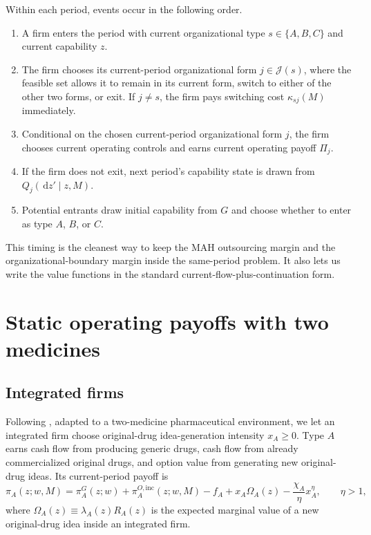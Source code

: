 \documentclass[12pt]{article}
\newcommand{\1}{\mathbf{1}}
\newcommand{\dd}{\,\mathrm{d}}
\begin{document}
Within each period, events occur in the following order.
\begin{enumerate}[leftmargin=2em]
    \item A firm enters the period with current organizational type $s\in\{A,B,C\}$ and current capability $z$.
    \item The firm chooses its current-period organizational form $j\in\mathcal J(s)$, where the feasible set allows it to remain in its current form, switch to either of the other two forms, or exit. If $j\neq s$, the firm pays switching cost $\kappa_{sj}(M)$ immediately.
    \item Conditional on the chosen current-period organizational form $j$, the firm chooses current operating controls and earns current operating payoff $\Pi_j$.
    \item If the firm does not exit, next period's capability state is drawn from $Q_j(\dd z'\mid z,M)$.
    \item Potential entrants draw initial capability from $G$ and choose whether to enter as type $A$, $B$, or $C$.
\end{enumerate}

This timing is the cleanest way to keep the MAH outsourcing margin and the organizational-boundary margin inside the same-period problem. It also lets us write the value functions in the standard current-flow-plus-continuation form.

\section{Static operating payoffs with two medicines}

\subsection{Integrated firms}

Following \citet{KletteKortum2004}, adapted to a two-medicine pharmaceutical environment, we let an integrated firm choose original-drug idea-generation intensity $x_A\ge 0$. Type $A$ earns cash flow from producing generic drugs, cash flow from already commercialized original drugs, and option value from generating new original-drug ideas. Its current-period payoff is
\begin{equation}
\pi_A(z;w,M)
=
\pi_A^G(z;w)
+\pi_A^{O,\mathrm{inc}}(z;w,M)
-f_A
+x_A\Omega_A(z)-\frac{\chi_A}{\eta}x_A^{\eta},
\qquad \eta>1,
\label{eq:piA}
\end{equation}
where $\Omega_A(z)\equiv \lambda_A(z)R_A(z)$ is the expected marginal value of a new original-drug idea inside an integrated firm.
\end{document}
